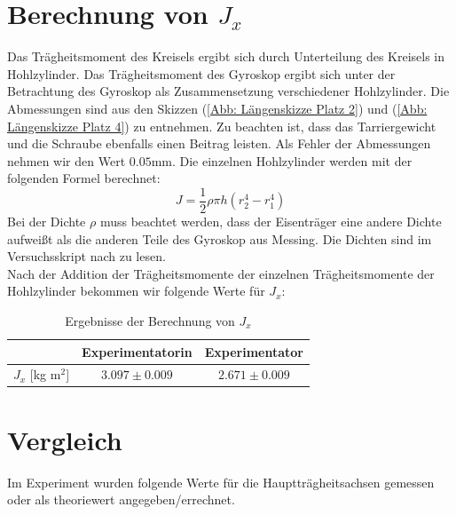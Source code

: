 \documentclass[bibliography=totocnumbered]{scrartcl}
\begin{document}
	
	
	\newpage
	\section{Berechnung von $ J_{x} $}
	Das Trägheitsmoment des Kreisels ergibt sich durch Unterteilung des Kreisels in Hohlzylinder.
	Das Trägheitsmoment des Gyroskop ergibt sich unter der Betrachtung des Gyroskop als Zusammensetzung verschiedener Hohlzylinder. Die Abmessungen sind aus den Skizzen (\ref{Abb: Längenskizze Platz 2}) und (\ref{Abb: Längenskizze Platz 4}) zu entnehmen. Zu beachten ist, dass das Tarriergewicht und die Schraube ebenfalls einen Beitrag leisten. Als Fehler der Abmessungen nehmen wir den Wert $ 0.05 $mm. Die einzelnen Hohlzylinder werden mit der folgenden Formel berechnet:
	\begin{equation}\label{eq: Berechnung von Jx}
		J=\dfrac{1}{2}\rho \pi h (r^{4}_{2}-r^{4}_{1})
	\end{equation}
	Bei der Dichte $ \rho $ muss beachtet werden, dass der Eisenträger eine andere Dichte aufweißt als die anderen Teile des Gyroskop aus Messing. Die Dichten sind im Versuchsskript\smartcite{Muller.d} nach zu lesen.\\
	Nach der Addition der Trägheitsmomente der einzelnen Trägheitsmomente der Hohlzylinder bekommen wir folgende Werte für $ J_{x} $:
	\begin{table}[ht!]
		\centering
		\caption[Ergebnisse]{Ergebnisse der Berechnung von $ J_{x} $}
		\begin{tabular}{|c|c|c|}
			\hline
			& Experimentatorin & Experimentator \\
			\hline
			$ J_{x} $ [kg m$ ^{2} $]&$  3.097\pm 0.009 $ & $ 2.671\pm 0.009 $ \\
			\hline
		\end{tabular}
		\label{tab: Berechnung von Jx}
	\end{table}
	
	
	
	
	
	
	
	
	
	
	
	
	
	\section{Vergleich}
	Im Experiment wurden folgende Werte für die Hauptträgheitsachsen gemessen oder als theoriewert angegeben/errechnet.
	
\end{document}
